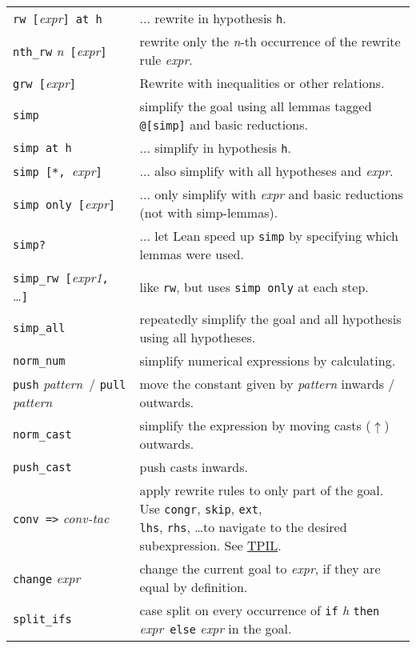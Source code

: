 \documentclass[a4paper]{article}
\newcommand{\lean}[1]{{\tt #1}}
\newcommand{\expr}[1][]{\textit{expr#1}\xspace}
\newcommand{\pattern}{\textit{pattern}\xspace}
\newcommand{\nat}{\textit{n}\xspace}
\begin{document}
\begin{center}
\begin{longtable}{@{}lp{113mm}@{}}
  \lean{rw [}\expr\lean{] at h} & $\ldots$ rewrite in hypothesis \lean{h}. \\
  \lean{nth\_rw} \nat\ \lean{[}\expr\lean{]} & rewrite only the \nat-th occurrence of the rewrite rule \expr.\\
  \lean{grw [}\expr\lean{]} & Rewrite with inequalities or other relations. \\
  \lean{simp} & simplify the goal using all lemmas tagged \lean{@[simp]} and basic reductions. \\
  \lean{simp at h} & $\ldots$ simplify in hypothesis \lean{h}. \\
  \lean{simp [*, }\expr\lean{]} & $\ldots$ also simplify with all hypotheses and \expr. \\
  \lean{simp only [}\expr\lean{]}& $\ldots$ only simplify with \expr and basic reductions (not with simp-lemmas). \\
  \lean{simp?}& $\ldots$ let Lean speed up \lean{simp} by specifying which lemmas were used. \\
  \lean{simp\_rw [}\expr[1]\lean{, }\ldots\lean{]} & like \lean{rw}, but uses \lean{simp only} at each step. \\
  \lean{simp\_all} & repeatedly simplify the goal and all hypothesis using all hypotheses.\\
  \lean{norm\_num} & simplify numerical expressions by calculating. \\
  \lean{push} \pattern\ / \lean{pull} \pattern & move the constant given by \pattern inwards / outwards.\\
  \lean{norm\_cast} & simplify the expression by moving casts ($\uparrow$) outwards.\\
  \lean{push\_cast} & push casts inwards.\\
  \lean{conv =>} \textit{conv-tac} &
    \makecell[lt]{apply rewrite rules to only part of the goal.
    Use \lean{congr}, \lean{skip}, \lean{ext}, \\ \lean{lhs}, \lean{rhs}, \ldots to navigate to the desired subexpression.
    See \href{https://docs.lean-lang.org/theorem_proving_in_lean4/conv.html}{TPIL}.}\\
  \lean{change} \expr & change the current goal to \expr, if they are equal by definition. \\
  \lean{split\_ifs} & case split on every occurrence of \lean{if} \textit{h} \lean{then} \expr\ \lean{else} \expr in the goal. \\

\end{longtable}
\end{center}
\end{document}
